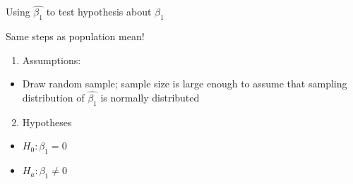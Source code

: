 \documentclass[
  8pt,
  ignorenonframetext,
  dvipsnames]{beamer}
\providecommand{\tightlist}{%
  \setlength{\itemsep}{0pt}\setlength{\parskip}{0pt}}
\let\olditem\item
\renewcommand{\item}{%
  \olditem\vspace{4pt}
}
\begin{document}
\begin{frame}{Using \(\hat{\beta_1}\) to test hypothesis about
\(\beta_1\)}
\protect\hypertarget{using-hatbeta_1-to-test-hypothesis-about-beta_1}{}

Same steps as population mean!

\begin{enumerate}
\tightlist
\item
  Assumptions:
\end{enumerate}

\begin{itemize}
\tightlist
\item
  Draw random sample; sample size is large enough to assume that
  sampling distribution of \(\hat{\beta_1}\) is normally distributed
\end{itemize}

\begin{enumerate}
\setcounter{enumi}{1}
\tightlist
\item
  Hypotheses
\end{enumerate}

\begin{itemize}
\tightlist
\item
  \(H_0: \beta_1 = 0\)
\item
  \(H_a: \beta_1 \ne 0\)
\end{itemize}

\end{frame}
\end{document}
